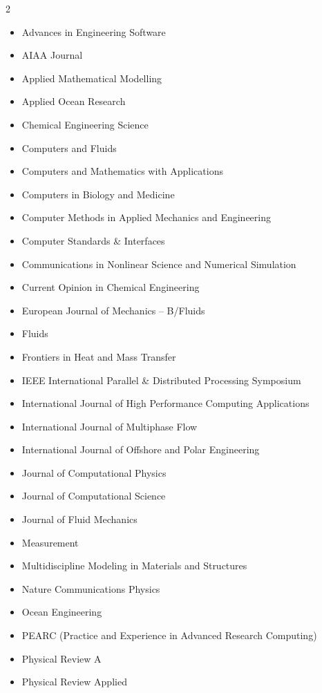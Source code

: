 \vspace{-0.5cm}
\begin{multicols}{2}
\begin{itemize}
    \item Advances in Engineering Software
    \item AIAA Journal
    \item Applied Mathematical Modelling
    \item Applied Ocean Research
    \item Chemical Engineering Science
    \item Computers and Fluids
    \item Computers and Mathematics with Applications
    \item Computers in Biology and Medicine
    \item Computer Methods in Applied Mechanics and Engineering
    \item Computer Standards \& Interfaces
    \item Communications in Nonlinear Science and Numerical Simulation
    \item Current Opinion in Chemical Engineering
    \item European Journal of Mechanics -- B/Fluids
    \item Fluids
    \item Frontiers in Heat and Mass Transfer
    \item IEEE International Parallel \& Distributed Processing Symposium
    \item International Journal of High Performance Computing Applications
    \item International Journal of Multiphase Flow
    \item International Journal of Offshore and Polar Engineering
    \item Journal of Computational Physics
    \item Journal of Computational Science
    \item Journal of Fluid Mechanics
    \item Measurement
    \item Multidiscipline Modeling in Materials and Structures
    \item Nature Communications Physics
    \item Ocean Engineering
    \item PEARC (Practice and Experience in Advanced Research Computing)
    \item Physical Review A
    \item Physical Review Applied

\end{itemize}
\end{multicols}
